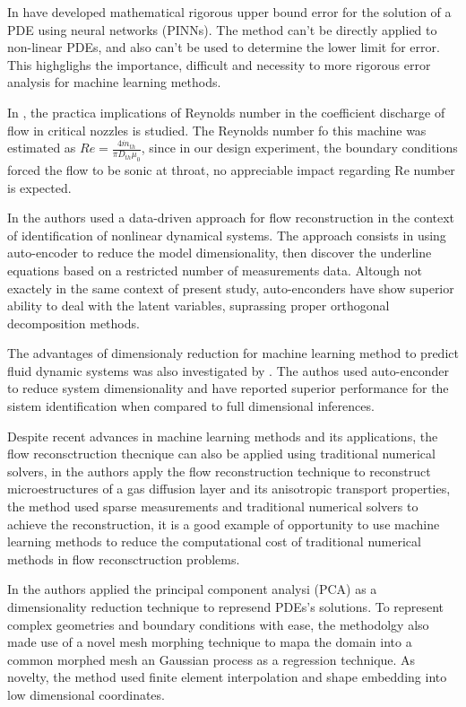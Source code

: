 In \cite{hillebrechtCertified2022} have developed mathematical rigorous upper bound error for the solution of a PDE using neural networks (PINNs). The method can't be directly applied to non-linear PDEs, and also can't be used to determine the lower limit for error. This highglighs the importance, difficult and necessity to more rigorous error analysis for machine learning methods.

In \cite{nagaoCharacteristics2013}, the practica implications of Reynolds number in the coefficient discharge of flow in critical nozzles is studied. The Reynolds number fo this machine was estimated as $Re=\frac{4 \dot{m}_{th}}{\pi D_{th} \mu_0}$, since in our design experiment, the boundary conditions forced the flow to be sonic at throat, no appreciable impact regarding Re number is expected. 

In \cite{dengDatadriven2021} the authors used a data-driven approach for flow reconstruction in the context of identification of nonlinear dynamical systems. The approach consists in using auto-encoder to reduce the model dimensionality, then discover the underline equations based on a restricted number of measurements data. Altough not exactely in the same context of present study, auto-enconders have show superior ability to deal with the latent variables, suprassing proper orthogonal decomposition methods.

The advantages of dimensionaly reduction for machine learning method to predict fluid dynamic systems was also investigated by \cite{kontolatiLearning2023}. The authos used auto-enconder to reduce system dimensionality and have reported superior performance for the sistem identification when compared to full dimensional inferences.

Despite recent advances in machine learning methods and its applications, the flow reconsctruction thecnique can also be applied using traditional numerical solvers, in \cite{zhangMicrostructure2021} the authors apply the flow reconstruction technique to reconstruct microestructures of a gas diffusion layer and its anisotropic transport properties, the method used sparse measurements and traditional numerical solvers to achieve the reconstruction, it is a good example of opportunity to use machine learning methods to reduce the computational cost of traditional numerical methods in flow reconsctruction problems.

In \cite{casenaveMMGP2023} the authors applied the principal component analysi (PCA) as a dimensionality reduction technique to represend PDEs's solutions. To represent complex geometries and boundary conditions with ease, the methodolgy also made use of a novel mesh morphing technique to mapa the domain into a common morphed mesh an Gaussian process as a regression technique. As novelty, the method used finite element interpolation and shape embedding into low dimensional coordinates. 

